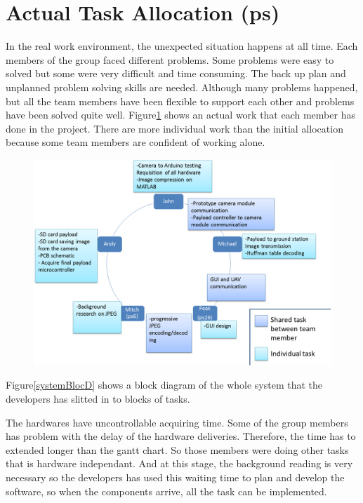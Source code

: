 \section{Actual Task Allocation (ps)}
In the real work environment, the unexpected situation happens at all time. 
Each members of the group faced different problems.
Some problems were easy to solved but some were very difficult and time consuming. 
The back up plan and unplanned problem solving skills are needed. 
Although many problems happened, but all the team members have been flexible to support each other and problems have been solved quite well. Figure\ref{final task allocation} shows an actual work that each member has done in the project. There are more individual work than the initial allocation because some team members are confident of working alone.

\begin{figure}[H]
        \centering
\includegraphics[width=1.0\textwidth]{figures/finalWorkAllocation.png} 
        \label{final task allocation}
\end{figure}

Figure\ref{systemBlocD} shows a block diagram of the whole system that the developers has slitted in to blocks of tasks. 

The hardwares have uncontrollable acquiring time. 
Some of the group members has problem with the delay of the hardware deliveries. Therefore, the time has to extended longer than the gantt chart. 
So those members were doing other tasks that is hardware independant. 
And at this stage, the background reading is very necessary so the developers has used this waiting time to plan and develop the software, so when the components arrive, all the task can be implemented.

